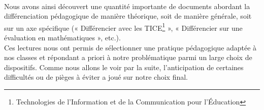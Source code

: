 \paragraph{} Nous avons ainsi découvert une quantité importante de documents abordant la différenciation pédagogique de manière théorique, soit de manière générale, soit sur un axe spécifique (« Différencier avec les TICE\footnote{Technologies de l'Information et de la Communication pour l'Éducation} », « Différencier sur une évaluation en mathématiques », etc.).\\
Ces lectures nous ont permis de sélectionner une pratique pédagogique adaptée à nos classes et répondant a priori à notre problématique parmi un large choix de dispositifs. Comme nous allons le voir par la suite, l'anticipation de certaines difficultés ou de pièges à éviter a joué sur notre choix final.


